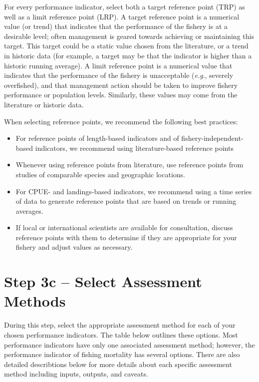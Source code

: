 \documentclass[]{book}
\begin{document}
For every performance indicator, select both a target reference point
(TRP) as well as a limit reference point (LRP). A target reference point
is a numerical value (or trend) that indicates that the performance of
the fishery is at a desirable level; often management is geared towards
achieving or maintaining this target. This target could be a static
value chosen from the literature, or a trend in historic data (for
example, a target may be that the indicator is higher than a historic
running average). A limit reference point is a numerical value that
indicates that the performance of the fishery is unacceptable
(\emph{e.g}., severely overfished), and that management action should be
taken to improve fishery performance or population levels. Similarly,
these values may come from the literature or historic data.

When selecting reference points, we recommend the following best
practices:

\begin{itemize}
\item
  For reference points of length-based indicators and of
  fishery-independent-based indicators, we recommend using
  literature-based reference points
\item
  Whenever using reference points from literature, use reference points
  from studies of comparable species and geographic locations.
\item
  For CPUE- and landings-based indicators, we recommend using a time
  series of data to generate reference points that are based on trends
  or running averages.
\item
  If local or international scientists are available for consultation,
  discuss reference points with them to determine if they are
  appropriate for your fishery and adjust values as necessary.
\end{itemize}

\section{Step 3c -- Select Assessment
Methods}\label{step-3c-select-assessment-methods}

During this step, select the appropriate assessment method for each of
your chosen performance indicators. The table below outlines these
options. Most performance indicators have only one associated assessment
method; however, the performance indicator of fishing mortality has
several options. There are also detailed describtions below for more
details about each specific assessment method including inputs, outputs,
and caveats.
\end{document}

